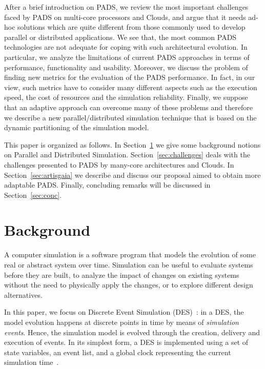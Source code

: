 \documentclass[1p]{elsarticle}
\begin{document}
After a brief introduction on PADS, we review the most important
challenges faced by PADS on multi-core processors and Clouds, and 
argue that it needs ad-hoc solutions which are quite different from 
those commonly used to develop parallel or distributed applications. 
We see that, the most common PADS technologies are not adequate for 
coping with such architectural evolution. In particular, we analyze 
the limitations of current PADS approaches in terms of performance, 
functionality and usability. Moreover, we discuss the problem of 
finding new metrics for the evaluation of the PADS performance. 
In fact, in our view, such metrics have to consider many different
aspects such as the execution speed, the cost of resources and the
simulation reliability. Finally, we suppose that an adaptive 
approach can overcome many of these problems and therefore we 
describe a new parallel/distributed simulation technique that is
based on the dynamic partitioning of the simulation model.

This paper is organized as follows. In Section~\ref{sec:background} we
give some background notions on Parallel and Distributed Simulation.
Section~\ref{sec:challenges} deals with the challenges presented to
PADS by many-core architectures and Clouds. In
Section~\ref{sec:artisgaia} we describe and discuss our proposal aimed
to obtain more adaptable PADS. Finally, concluding remarks will be
discussed in Section~\ref{sec:conc}.

\section{Background}\label{sec:background}

A computer simulation is a software program that models the evolution
of some real or abstract system over time. Simulation can be useful to
evaluate systems before they are built, to analyze the impact of
changes on existing systems without the need to physically apply the
changes, or to explore different design alternatives.

In this paper, we focus on Discrete Event Simulation
(DES)~\cite{Law:1999:SMA:554952}: in a DES, the model evolution
happens at discrete points in time by means of \emph{simulation
  events}. Hence, the simulation model is evolved through the
creation, delivery and execution of events. In its simplest form, a
DES is implemented using a set of state variables, an event list, and
a global clock representing the current simulation
time~\cite{Law:1999:SMA:554952}.
\end{document}

